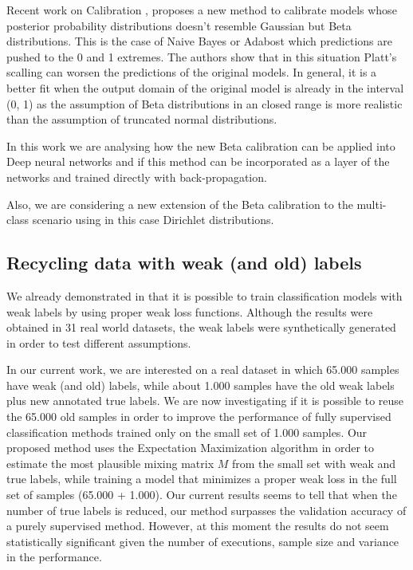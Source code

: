 \documentclass[a4paper, 12pt]{article}
\begin{document}
Recent work on Calibration \cite{Kull2017}, proposes a new method to calibrate models whose posterior probability distributions doesn't resemble Gaussian but Beta distributions.
This is the case of Naive Bayes or Adabost which predictions are pushed to the 0 and 1 extremes.
The authors show that in this situation Platt's scalling can worsen the predictions of the original models.
In general, it is a better fit when the output domain of the original model is already in the interval (0, 1) as the assumption of Beta distributions in an closed range is more realistic than the assumption of truncated normal distributions.

In this work we are analysing how the new Beta calibration can be applied into Deep neural networks and if this method can be incorporated as a layer of the networks and trained directly with back-propagation.

Also, we are considering a new extension of the Beta calibration to the multi-class scenario using in this case Dirichlet distributions.

\subsection{Recycling data with weak (and old) labels}
\label{sec:fut:weak}

We already demonstrated in \cite{perello2017} that it is possible to train classification models with weak labels by using proper weak loss functions.
Although the results were obtained in 31 real world datasets, the weak labels were synthetically generated in order to test different assumptions.

In our current work, we are interested on a real dataset in which 65.000 samples have weak (and old) labels, while about 1.000 samples have the old weak labels plus new annotated true labels.
We are now investigating if it is possible to reuse the 65.000 old samples in order to improve the performance of fully supervised classification methods trained only on the small set of 1.000 samples.
Our proposed method uses the Expectation Maximization algorithm in order to estimate the most plausible mixing matrix $M$ from the small set with weak and true labels, while training a model that minimizes a proper weak loss in the full set of samples (65.000 + 1.000).
Our current results seems to tell that when the number of true labels is reduced, our method surpasses the validation accuracy of a purely supervised method.
However, at this moment the results do not seem statistically significant given the number of executions, sample size and variance in the performance.
\end{document}
